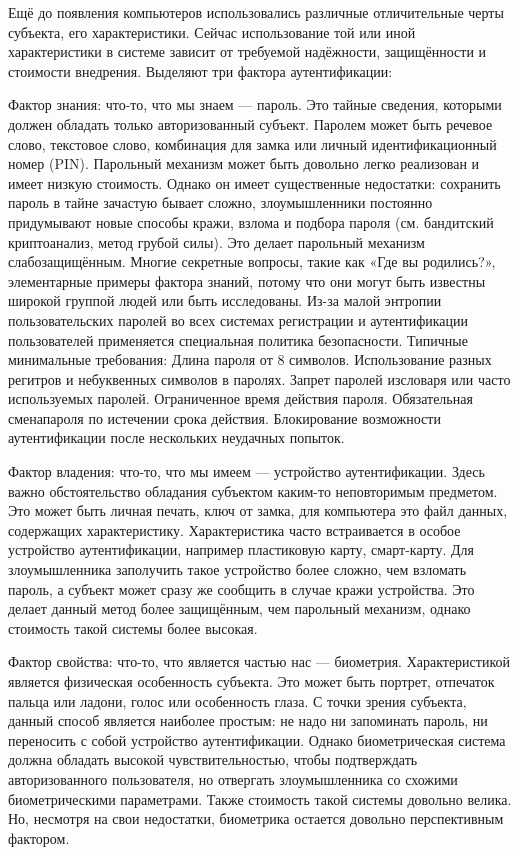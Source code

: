 Ещё до появления компьютеров использовались различные отличительные черты субъекта, его характеристики. Сейчас использование той или иной характеристики в системе зависит от требуемой надёжности, защищённости и стоимости внедрения. Выделяют три фактора аутентификации:

Фактор знания: что-то, что мы знаем — пароль. Это тайные сведения, которыми должен обладать только авторизованный субъект. Паролем может быть речевое слово, текстовое слово, комбинация для замка или личный идентификационный номер (PIN). Парольный механизм может быть довольно легко реализован и имеет низкую стоимость. Однако он имеет существенные недостатки: сохранить пароль в тайне зачастую бывает сложно, злоумышленники постоянно придумывают новые способы кражи, взлома и подбора пароля (см. бандитский криптоанализ, метод грубой силы). Это делает парольный механизм слабозащищённым. Многие секретные вопросы, такие как «Где вы родились?», элементарные примеры фактора знаний, потому что они могут быть известны широкой группой людей или быть исследованы. Из-за малой энтропии пользовательских паролей во всех системах регистрации и аутентификации пользователей применяется специальная политика безопасности. Типичные минимальные требования: Длина пароля от 8 символов. Использование разных регитров и небуквенных символов в паролях. Запрет паролей изсловаря или часто используемых паролей. Ограниченное время действия пароля. Обязательная сменапароля по истечении срока действия. Блокирование возможности аутентификации после нескольких неудачных попыток.

Фактор владения: что-то, что мы имеем — устройство аутентификации. Здесь важно обстоятельство обладания субъектом каким-то неповторимым предметом. Это может быть личная печать, ключ от замка, для компьютера это файл данных, содержащих характеристику. Характеристика часто встраивается в особое устройство аутентификации, например пластиковую карту, смарт-карту. Для злоумышленника заполучить такое устройство более сложно, чем взломать пароль, а субъект может сразу же сообщить в случае кражи устройства. Это делает данный метод более защищённым, чем парольный механизм, однако стоимость такой системы более высокая.

Фактор свойства: что-то, что является частью нас — биометрия. Характеристикой является физическая особенность субъекта. Это может быть портрет, отпечаток пальца или ладони, голос или особенность глаза. С точки зрения субъекта, данный способ является наиболее простым: не надо ни запоминать пароль, ни переносить с собой устройство аутентификации. Однако биометрическая система должна обладать высокой чувствительностью, чтобы подтверждать авторизованного пользователя, но отвергать злоумышленника со схожими биометрическими параметрами. Также стоимость такой системы довольно велика. Но, несмотря на свои недостатки, биометрика остается довольно перспективным фактором.

